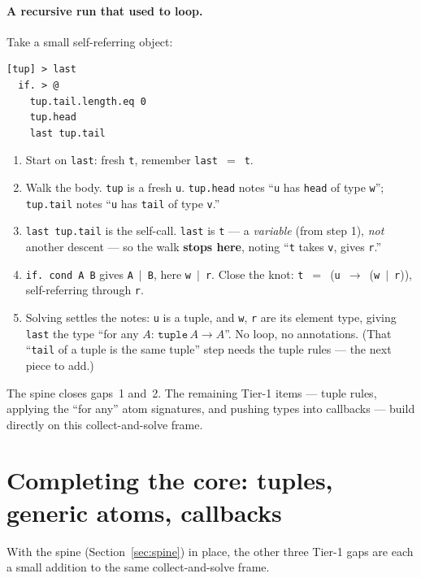 \documentclass[10pt]{article}
\newcommand{\ty}[1]{\mathtt{#1}}     %
\begin{document}
\paragraph{A recursive run that used to loop.} Take a small self-referring
object:
\begin{lstlisting}
[tup] > last
  if. > @
    tup.tail.length.eq 0
    tup.head
    last tup.tail
\end{lstlisting}
\begin{enumerate}\setlength{\itemsep}{1pt}
\item Start on \verb|last|: fresh \verb|t|, remember \verb|last|~$=$~\verb|t|.
\item Walk the body. \verb|tup| is a fresh \verb|u|. \verb|tup.head| notes
  ``\verb|u| has \verb|head| of type \verb|w|''; \verb|tup.tail| notes ``\verb|u|
  has \verb|tail| of type \verb|v|.''
\item \verb|last tup.tail| is the self-call. \verb|last| is \verb|t| --- a
  \emph{variable} (from step 1), \emph{not} another descent --- so the walk
  \textbf{stops here}, noting ``\verb|t| takes \verb|v|, gives \verb|r|.''
\item \verb|if. cond A B| gives \verb|A|~$\mid$~\verb|B|, here
  \verb|w|~$\mid$~\verb|r|. Close the knot: \verb|t|~$=$~(\verb|u|~$\to$~(\verb|w|~$\mid$~\verb|r|)),
  self-referring through \verb|r|.
\item Solving settles the notes: \verb|u| is a tuple, and \verb|w|, \verb|r| are
  its element type, giving \verb|last| the type ``for any $A$:
  $\ty{tuple}\,A \to A$''. No loop, no annotations. (That ``\verb|tail| of a
  tuple is the same tuple'' step needs the tuple rules --- the next piece to add.)
\end{enumerate}
The spine closes gaps~1 and~2. The remaining Tier-1 items --- tuple rules,
applying the ``for any'' atom signatures, and pushing types into callbacks ---
build directly on this collect-and-solve frame.

\section{Completing the core: tuples, generic atoms, callbacks}\label{sec:core-rest}

With the spine (Section~\ref{sec:spine}) in place, the other three Tier-1 gaps
are each a small addition to the same collect-and-solve frame.
\end{document}
